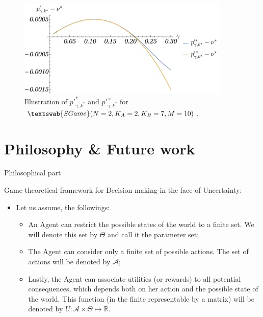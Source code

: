 \documentclass{beamer}
\theoremstyle{definition}
\newcommand{\SG}[1]{$\textswab{SGame}(#1)$}
\begin{document}
\begin{frame}{}

    \begin{figure}[H]
    \centering
    \includegraphics[width=0.9\textwidth]{img/AsymptoticExpasion_pp.pdf}
    \caption{\small \centering Illustration of $p'^*_{\gamma,k^*}$ and $p'^\times_{\gamma,k^*}$ for \SG{N=2,K_A=2,K_B=7,M=10}.}
    \label{fig:Asymptotic_pp}
\end{figure}

\end{frame}

\section{Philosophy \& Future work}

\begin{frame}{Philosophical part}

Game-theoretical framework for Decision making in the face of Uncertainty:

\begin{itemize}
    \item Let us assume, the followings:
    \begin{itemize}
    \item An Agent can restrict the possible states of the world to a finite set. We will denote this set by $\Theta$ and call it the parameter set;
    \item The Agent can consider only a finite set of possible actions. The set of actions will be denoted by $\mathcal{A}$;
    \item Lastly, the Agent can associate utilities (or rewards) to all potential consequences, which depends both on her action and the possible state of the world. This function (in the finite representable by a matrix) will be denoted by $U: \mathcal{A} \times \Theta \mapsto \mathbb{R}$.
\end{itemize}
\end{itemize}

\end{frame}
\end{document}
